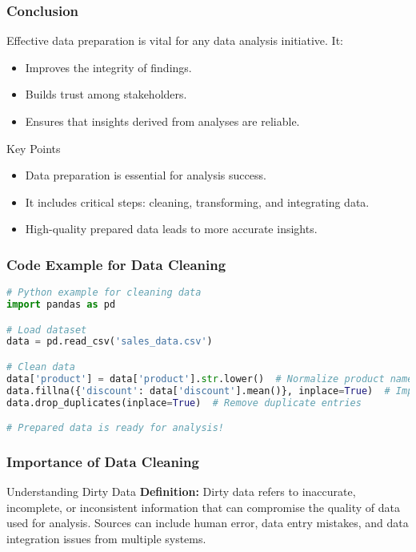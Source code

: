 \documentclass{beamer}
\begin{document}
\begin{frame}[fragile]
    \frametitle{Conclusion}
    Effective data preparation is vital for any data analysis initiative. It:
    \begin{itemize}
        \item Improves the integrity of findings.
        \item Builds trust among stakeholders.
        \item Ensures that insights derived from analyses are reliable.
    \end{itemize}
    \begin{block}{Key Points}
        \begin{itemize}
            \item Data preparation is essential for analysis success.
            \item It includes critical steps: cleaning, transforming, and integrating data.
            \item High-quality prepared data leads to more accurate insights.
        \end{itemize}
    \end{block}
\end{frame}

\begin{frame}[fragile]
    \frametitle{Code Example for Data Cleaning}
    \begin{lstlisting}[language=Python]
# Python example for cleaning data
import pandas as pd

# Load dataset
data = pd.read_csv('sales_data.csv')

# Clean data
data['product'] = data['product'].str.lower()  # Normalize product names
data.fillna({'discount': data['discount'].mean()}, inplace=True)  # Impute missing discounts
data.drop_duplicates(inplace=True)  # Remove duplicate entries

# Prepared data is ready for analysis!
    \end{lstlisting}
\end{frame}

\begin{frame}[fragile]
    \frametitle{Importance of Data Cleaning}
    \begin{block}{Understanding Dirty Data}
        \textbf{Definition:} Dirty data refers to inaccurate, incomplete, or inconsistent information that can compromise the quality of data used for analysis. Sources can include human error, data entry mistakes, and data integration issues from multiple systems.
    \end{block}
\end{frame}
\end{document}
